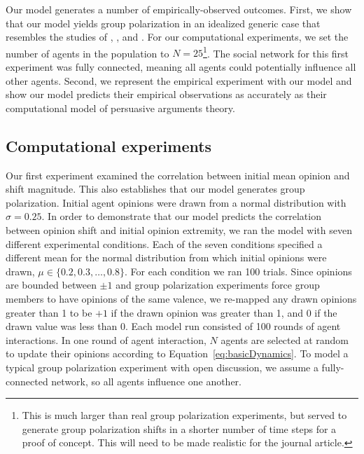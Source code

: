 Our model generates a number of empirically-observed outcomes. 
First, we show that our model 
yields group polarization in an idealized generic case that 
resembles the studies of  , , and .  For our computational experiments, we set the number of agents in the 
population to $N=25$\footnote{This is much larger than real group polarization experiments, but
served to generate group polarization shifts in a shorter number of time steps
for a proof of concept. This will need to be made realistic for the journal article.}. 
The social network for this first experiment was fully connected, meaning all agents could 
potentially influence all other agents. Second, we represent the  
empirical experiment with our model and show our model predicts their 
empirical observations as accurately as their computational model of 
persuasive arguments theory.


\subsection{Computational experiments}

Our first experiment examined the correlation between initial mean opinion 
and shift magnitude. This also establishes that our model
generates group polarization. 
Initial agent opinions were drawn from a normal distribution 
with $\sigma=0.25$. In order to demonstrate that our model predicts the correlation
between opinion shift and initial opinion extremity, we ran the model with
seven different experimental conditions. Each of the seven conditions 
specified a different mean for the normal distribution from which initial opinions were drawn,
$\mu \in \{0.2, 0.3, \ldots, 0.8\}$. For each condition we ran 100 trials. %
Since opinions are bounded between $\pm1$ and group polarization experiments
force group members to have opinions of the same valence,
we re-mapped any drawn opinions greater than 1 to be $+1$ if
the drawn opinion was greater than 1, and 0 if the drawn value was less than 0.
Each model run consisted of 100 rounds of agent interactions. 
In one round of agent interaction, $N$ agents are
selected at random to update their opinions according to 
Equation~\ref{eq:basicDynamics}. To model a typical group polarization experiment
with open discussion, we assume a fully-connected network, so all agents
influence one another.


